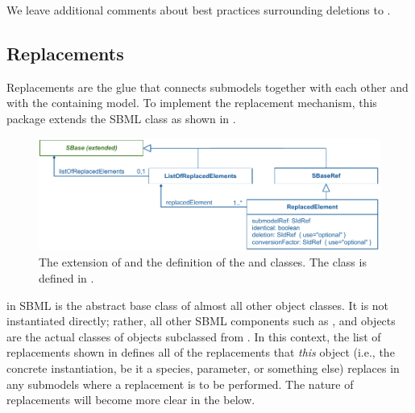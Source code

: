 We leave additional comments about best practices surrounding deletions
to .


\subsection{Replacements}
\label{replacements}

Replacements are the glue that connects submodels together with each
other and with the containing model.  To implement the replacement
mechanism, this package extends the SBML \SBase class as shown in
.

\begin{figure}[hbt]
  \includegraphics{figs/extended-sbase-uml}
  \caption{The extension of \SBase and the definition of the
    \ListOfReplacedElements and \ReplacedElement classes.  The \SBaseRef
  class is defined in .}
  \label{extended-sbase-uml}
\end{figure}




\SBase in SBML is the abstract base class of almost all other object
classes.  It is not instantiated directly; rather, all other SBML
components such as \Species, \Compartment and \Reaction objects are the
actual classes of objects subclassed from \SBase.  In this context, the
list of replacements shown in  defines all of the
replacements that \emph{this} object (i.e., the concrete instantiation,
be it a species, parameter, or something else) replaces in any submodels
where a replacement is to be performed.  The nature of replacements will
become more clear in the  below.


